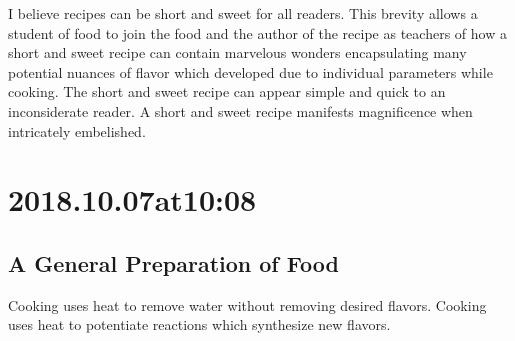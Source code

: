 I believe recipes can be short and sweet for all readers.
This brevity allows a student of food to join the food and the author of the recipe as teachers of how a short and sweet recipe can contain marvelous wonders encapsulating many potential nuances of flavor which developed due to individual parameters while cooking.
The short and sweet recipe can appear simple and quick to an inconsiderate reader.
A short and sweet recipe manifests magnificence when intricately embelished.

\section*{ 2018.10.07at10:08 }
\subsection*{ A General Preparation of Food }
Cooking uses heat to remove water without removing desired flavors. Cooking uses heat to potentiate reactions which synthesize new flavors.

